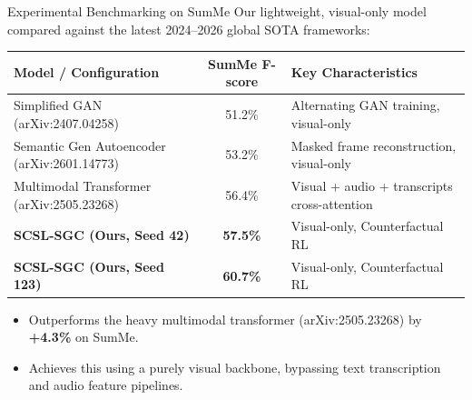 \documentclass[aspectratio=169]{beamer}
\begin{document}
\begin{frame}{Experimental Benchmarking on SumMe}
    Our lightweight, visual-only model compared against the latest 2024--2026 global SOTA frameworks:
    \begin{center}
        \small
        \begin{tabular}{lcl}
            \toprule
            \textbf{Model / Configuration} & \textbf{SumMe F-score} & \textbf{Key Characteristics} \\
            \midrule
            Simplified GAN (arXiv:2407.04258) & 51.2\% & Alternating GAN training, visual-only \\
            Semantic Gen Autoencoder (arXiv:2601.14773) & 53.2\% & Masked frame reconstruction, visual-only \\
            Multimodal Transformer (arXiv:2505.23268) & 56.4\% & Visual + audio + transcripts cross-attention \\
            \midrule
            \textbf{SCSL-SGC (Ours, Seed 42)} & \textbf{57.5\%} & Visual-only, Counterfactual RL \\
            \textbf{SCSL-SGC (Ours, Seed 123)} & \textbf{60.7\%} & Visual-only, Counterfactual RL \\
            \bottomrule
        \end{tabular}
    \end{center}
    \begin{itemize}
        \item Outperforms the heavy multimodal transformer (arXiv:2505.23268) by \textbf{+4.3\%} on SumMe.
        \item Achieves this using a purely visual backbone, bypassing text transcription and audio feature pipelines.
    \end{itemize}
\end{frame}
\end{document}

